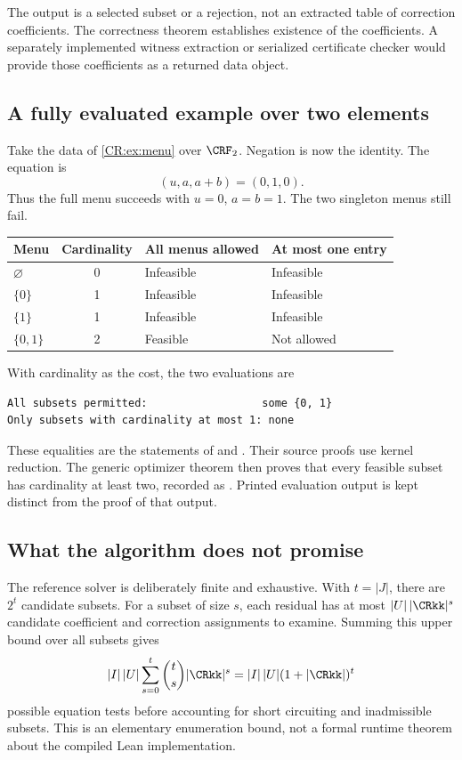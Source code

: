The output is a selected subset or a rejection, not an extracted table of correction coefficients. The correctness theorem establishes existence of the coefficients. A separately implemented witness extraction or serialized certificate checker would provide those coefficients as a returned data object.

\subsection{A fully evaluated example over two elements}\label{CR:sec:f2}
Take the data of \cref{CR:ex:menu} over $\CRF_2$. Negation is now the identity. The equation is
\[
(u,a,a+b)=(0,1,0).
\]
Thus the full menu succeeds with $u=0$, $a=b=1$. The two singleton menus still fail.

\begin{center}
\begin{tabular}{@{}lcll@{}}
\toprule
Menu & Cardinality & All menus allowed & At most one entry\\
\midrule
$\varnothing$ & 0 & Infeasible & Infeasible\\
$\{0\}$ & 1 & Infeasible & Infeasible\\
$\{1\}$ & 1 & Infeasible & Infeasible\\
$\{0,1\}$ & 2 & Feasible & Not allowed\\
\bottomrule
\end{tabular}
\end{center}

With cardinality as the cost, the two evaluations are
\begin{Verbatim}[fontsize=\small,frame=single,framesep=8pt,rulecolor=\color{RuleGray}]
All subsets permitted:                  some {0, 1}
Only subsets with cardinality at most 1: none
\end{Verbatim}
These equalities are the statements of
 and
. Their source proofs use kernel reduction. The generic optimizer theorem then proves that every feasible subset has cardinality at least two, recorded as . Printed evaluation output is kept distinct from the proof of that output.

\subsection{What the algorithm does not promise}
The reference solver is deliberately finite and exhaustive. With $t=|J|$, there are $2^t$ candidate subsets. For a subset of size $s$, each residual has at most $|U|\,|\CRkk|^s$ candidate coefficient and correction assignments to examine. Summing this upper bound over all subsets gives
\[
|I|\,|U|\sum_{s=0}^t\binom ts|\CRkk|^s
=|I|\,|U|(1+|\CRkk|)^t
\]
possible equation tests before accounting for short circuiting and inadmissible subsets. This is an elementary enumeration bound, not a formal runtime theorem about the compiled Lean implementation.

